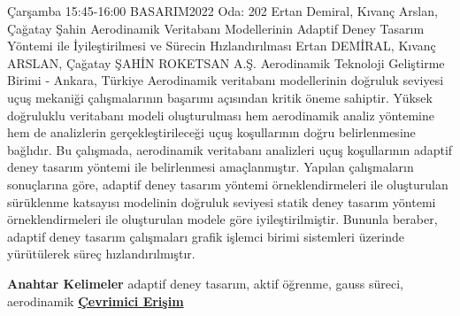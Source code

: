 
    \begin{abstract_basarim}
    {Çarşamba 15:45-16:00}
    {BASARIM2022}
    {Oda: 202}
    {Ertan Demiral, Kıvanç Arslan, Çağatay Şahin}
    {Aerodinamik Veritabanı Modellerinin Adaptif Deney Tasarım Yöntemi ile İyileştirilmesi ve Sürecin Hızlandırılması}
    {%
    Ertan DEMİRAL, Kıvanç ARSLAN, Çağatay ŞAHİN}
    {%
    }
    {%
    ROKETSAN A.Ş. Aerodinamik Teknoloji Geliştirme Birimi - Ankara, Türkiye}
    Aerodinamik veritabanı modellerinin doğruluk seviyesi uçuş mekaniği çalışmalarının başarımı açısından kritik öneme sahiptir. Yüksek doğruluklu veritabanı modeli oluşturulması hem aerodinamik analiz yöntemine hem de analizlerin gerçekleştirileceği uçuş koşullarının doğru belirlenmesine bağlıdır. Bu çalışmada, aerodinamik veritabanı analizleri uçuş koşullarının adaptif deney tasarım yöntemi ile belirlenmesi amaçlanmıştır. Yapılan çalışmaların sonuçlarına göre, adaptif deney tasarım yöntemi örneklendirmeleri ile oluşturulan sürüklenme katsayısı modelinin doğruluk seviyesi statik deney tasarım yöntemi örneklendirmeleri ile oluşturulan modele göre iyileştirilmiştir. Bununla beraber, adaptif deney tasarım çalışmaları grafik işlemci birimi sistemleri üzerinde yürütülerek süreç hızlandırılmıştır. 
    
            \textbf{Anahtar Kelimeler} \newline{}adaptif deney tasarım, aktif öğrenme, gauss süreci, aerodinamik
     \newline\newline\noindent \href{https://drive.google.com/file/d/1pF5rZu-6ELVj9ZsweeLNf2EtRDMu29VK/view?usp=sharing}{\bfseries Çevrimici Erişim}
    \end{abstract_basarim}
    